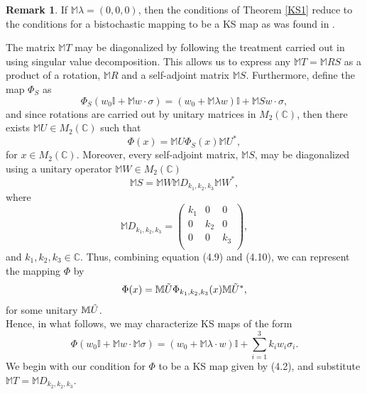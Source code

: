 \documentclass[11pt,reqno]{amsart}
\theoremstyle{definition}
\newtheorem{remark}[subsection]{Remark}
\numberwithin{equation}{section} \setcounter{tocdepth}{1}
\def\bm{{\mathbb M}}
\numberwithin{equation}{section}
\begin{document}
\begin{remark}  If  $\bm{\lambda}=(0,0,0)$, then the conditions of Theorem \ref{KS1} reduce to the conditions for a bistochastic mapping to be a KS map as was found in \cite{KS,MA2010}.
\end{remark}

\noindent The matrix $\bm{T}$ may be diagonalized by following the treatment carried out in \cite{king_minimal_2001} using singular value decomposition. This allows us to express any $\bm{T=\bm{RS}}$ as a product of a rotation, $\bm{R}$ and a self-adjoint matrix $\bm{S}.$ Furthermore, define the map $\Phi_{S}$ as
\begin{equation}
    \Phi_S(w_0\mathbb{I}+\bm{w\cdot \sigma})=(w_0+\bm{\lambda w})\mathbb{I}+\bm{Sw\cdot \sigma},
\end{equation} and since rotations are carried out by unitary matrices in $M_2(\mathbb{C})$, then there exists $\bm{U}\in M_2(\mathbb{C}) $ such that
\begin{equation}
    \Phi(x)=\bm{U}\Phi_S(x)\bm{U}^*,
\end{equation}for $x \in M_2(\mathbb{C})$. Moreover, every self-adjoint matrix, $\bm{S}$, may be diagonalized using a unitary operator $\bm{W}\in M_2(\mathbb{C})$
\begin{equation}
    \bm{S}=\bm{W}\bm{D}_{k_1,k_2,k_3}\bm{W}^*,
\end{equation}where
\begin{equation}
    \bm{D}_{k_1,k_2,k_3}=\begin{pmatrix}
        k_1 & 0 & 0\\
        0 & k_2 & 0\\
         0 & 0 & k_3\\
    \end{pmatrix},
\end{equation}and $k_1,k_2,k_3 \in \mathbb{C}.$ Thus, combining equation (4.9) and (4.10), we can represent the mapping $\Phi$ by
\begin{equation}
    \Phi(x)=\bm{\Tilde{U}}\Phi_{k_1,k_2,k_3}(x)\bm{\Tilde{U}}^*,
\end{equation}for some unitary $\bm{\Tilde{U}}$. \\

Hence, in what follows, we may characterize KS maps of the form
\begin{equation}\label{KSS}
    \Phi(w_0\mathbb{I}+\bm{w}\cdot \bm{\sigma})=(w_0+\bm{\lambda \cdot w})\mathbb{I}+\sum_{i=1}^3 k_iw_i\sigma_i.
\end{equation} We begin with our condition for $\Phi$ to be a KS map given by (4.2), and substitute $\bm{T}=\bm{D}_{k_2,k_2,k_3}$.
\end{document}
